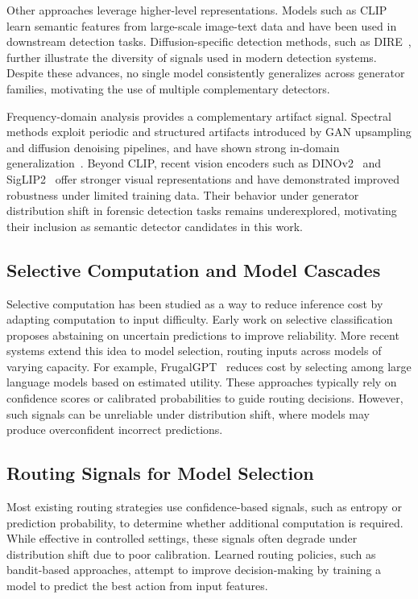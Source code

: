 \documentclass{ieeeaccess}
\begin{document}
Other approaches leverage higher-level representations. Models such as CLIP~\cite{pmlr-v139-radford21a} learn semantic features from large-scale image-text data and have been used in downstream detection tasks. Diffusion-specific detection methods, such as DIRE~\cite{Wang_2023_ICCV}, further illustrate the diversity of signals used in modern detection systems. Despite these advances, no single model consistently generalizes across generator families, motivating the use of multiple complementary detectors.

Frequency-domain analysis provides a complementary artifact signal. Spectral methods
exploit periodic and structured artifacts introduced by GAN upsampling and diffusion
denoising pipelines, and have shown strong in-domain generalization~\cite{Corvi_2023_ICASSP}.
Beyond CLIP, recent vision encoders such as DINOv2~\cite{oquab2023dinov2} and
SigLIP2~\cite{tschannen2025siglip2} offer stronger visual representations and have
demonstrated improved robustness under limited training data. Their behavior under
generator distribution shift in forensic detection tasks remains underexplored, motivating
their inclusion as semantic detector candidates in this work.


\subsection{Selective Computation and Model Cascades}

Selective computation has been studied as a way to reduce inference cost by adapting computation to input difficulty. Early work on selective classification~\cite{NIPS2017_4a8423d5} proposes abstaining on uncertain predictions to improve reliability. More recent systems extend this idea to model selection, routing inputs across models of varying capacity. For example, FrugalGPT~\cite{chen2024frugalgpt} reduces cost by selecting among large language models based on estimated utility. These approaches typically rely on confidence scores or calibrated probabilities to guide routing decisions. However, such signals can be unreliable under distribution shift, where models may produce overconfident incorrect predictions.

\subsection{Routing Signals for Model Selection}

Most existing routing strategies use confidence-based signals, such as entropy or prediction probability, to determine whether additional computation is required. While effective in controlled settings, these signals often degrade under distribution shift due to poor calibration. Learned routing policies, such as bandit-based approaches, attempt to improve decision-making by training a model to predict the best action
from input features.
\end{document}
